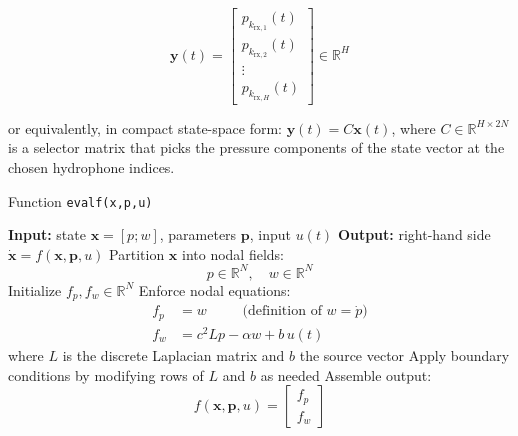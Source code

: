 \documentclass[11pt]{article}
\begin{document}
\[
\mathbf{y}(t) = 
\begin{bmatrix}
p_{k_{\mathrm{rx},1}}(t) \\
p_{k_{\mathrm{rx},2}}(t) \\
\vdots \\
p_{k_{\mathrm{rx},H}}(t)
\end{bmatrix}
\in \mathbb{R}^{H}
\]

or equivalently, in compact state-space form: $\mathbf{y}(t) = C \mathbf{x}(t)$, where $C \in \mathbb{R}^{H \times 2N}$ is a selector matrix that picks the pressure components of the state vector at the chosen hydrophone indices.

\newpage

\begin{algorithm}[h]
\caption{Function \texttt{evalf(x,p,u)}}
\begin{algorithmic}[1]
\State \textbf{Input:} state $\mathbf{x} = [p;w]$, parameters $\mathbf{p}$, input $u(t)$
\State \textbf{Output:} right-hand side $\dot{\mathbf{x}} = f(\mathbf{x},\mathbf{p},u)$
\vspace{6pt}
\State Partition $\mathbf{x}$ into nodal fields:
\[
p \in \mathbb{R}^N, \quad w \in \mathbb{R}^N
\]
\State Initialize $f_p, f_w \in \mathbb{R}^N$
\State Enforce nodal equations:
\begin{align*}
f_p &= w \qquad \;\; \text{(definition of $w=\dot p$)} \\
f_w &= c^2 L p - \alpha w + b\,u(t)
\end{align*}
where $L$ is the discrete Laplacian matrix and $b$ the source vector
\State Apply boundary conditions by modifying rows of $L$ and $b$ as needed
\State Assemble output:
\[
f(\mathbf{x},\mathbf{p},u) =
\begin{bmatrix}
f_p \\ f_w
\end{bmatrix}
\]
\end{algorithmic}
\end{algorithm}
\end{document}
